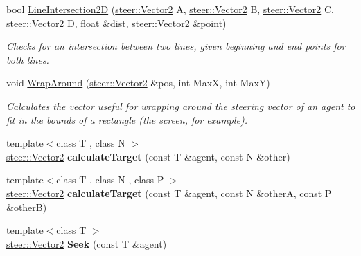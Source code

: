 \begin{DoxyCompactItemize}
\item 
bool \hyperlink{namespacesteer_a60de043149c12ac3a88fa7984609751c}{Line\-Intersection2\-D} (\hyperlink{structsteer_1_1_vector2}{steer\-::\-Vector2} A, \hyperlink{structsteer_1_1_vector2}{steer\-::\-Vector2} B, \hyperlink{structsteer_1_1_vector2}{steer\-::\-Vector2} C, \hyperlink{structsteer_1_1_vector2}{steer\-::\-Vector2} D, float \&dist, \hyperlink{structsteer_1_1_vector2}{steer\-::\-Vector2} \&point)
\begin{DoxyCompactList}\small\item\em Checks for an intersection between two lines, given beginning and end points for both lines. \end{DoxyCompactList}\item 
void \hyperlink{namespacesteer_a873d9abe2a1b506e7b98698181cde7fb}{Wrap\-Around} (\hyperlink{structsteer_1_1_vector2}{steer\-::\-Vector2} \&pos, int Max\-X, int Max\-Y)
\begin{DoxyCompactList}\small\item\em Calculates the vector useful for wrapping around the steering vector of an agent to fit in the bounds of a rectangle (the screen, for example). \end{DoxyCompactList}\item 
\hypertarget{namespacesteer_ab4b663063284092ac7ab7ce102537577}{{\footnotesize template$<$class T , class N $>$ }\\\hyperlink{structsteer_1_1_vector2}{steer\-::\-Vector2} {\bfseries calculate\-Target} (const T \&agent, const N \&other)}\label{namespacesteer_ab4b663063284092ac7ab7ce102537577}

\item 
\hypertarget{namespacesteer_ad5c14b47b11e070f4950a1aee6540c01}{{\footnotesize template$<$class T , class N , class P $>$ }\\\hyperlink{structsteer_1_1_vector2}{steer\-::\-Vector2} {\bfseries calculate\-Target} (const T \&agent, const N \&other\-A, const P \&other\-B)}\label{namespacesteer_ad5c14b47b11e070f4950a1aee6540c01}

\item 
\hypertarget{namespacesteer_a4a2a379977815aa62658d18699956c10}{{\footnotesize template$<$class T $>$ }\\\hyperlink{structsteer_1_1_vector2}{steer\-::\-Vector2} {\bfseries Seek} (const T \&agent)}\label{namespacesteer_a4a2a379977815aa62658d18699956c10}


\end{DoxyCompactItemize}
